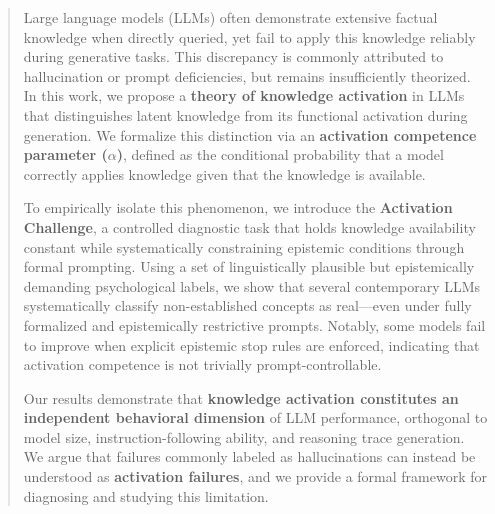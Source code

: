 

\begin{abstract}
Large language models (LLMs) often demonstrate extensive factual knowledge when directly queried, yet fail to apply this knowledge reliably during generative tasks. This discrepancy is commonly attributed to hallucination or prompt deficiencies, but remains insufficiently theorized. In this work, we propose a \textbf{theory of knowledge activation} in LLMs that distinguishes latent knowledge from its functional activation during generation. We formalize this distinction via an \textbf{activation competence parameter ($\alpha$)}, defined as the conditional probability that a model correctly applies knowledge given that the knowledge is available.

To empirically isolate this phenomenon, we introduce the \textbf{Activation Challenge}, a controlled diagnostic task that holds knowledge availability constant while systematically constraining epistemic conditions through formal prompting. Using a set of linguistically plausible but epistemically demanding psychological labels, we show that several contemporary LLMs systematically classify non-established concepts as real---even under fully formalized and epistemically restrictive prompts. Notably, some models fail to improve when explicit epistemic stop rules are enforced, indicating that activation competence is not trivially prompt-controllable.

Our results demonstrate that \textbf{knowledge activation constitutes an independent behavioral dimension} of LLM performance, orthogonal to model size, instruction-following ability, and reasoning trace generation. We argue that failures commonly labeled as hallucinations can instead be understood as \textbf{activation failures}, and we provide a formal framework for diagnosing and studying this limitation.
\end{abstract}



